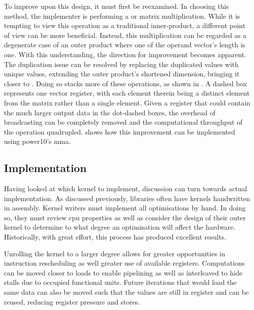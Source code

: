 \documentclass[\main/thesis.tex]{subfiles}
\begin{document}
To improve upon this design, it must first be reexamined.
In choosing this method, the implementer is performing a  or  matrix multiplication.
While it is tempting to view this operation as a traditional inner-product, a different point of view can be more beneficial.
Instead, this multiplication can be regarded as a degenerate case of an outer product where one of the operand vector's length is one.
With this understanding, the direction for improvement becomes apparent.
The duplication issue can be resolved by replacing the duplicated values with unique values, extending the outer product's shortened dimension, bringing it closer to .
Doing so stacks more of these operations, as shown in .
A dashed box represents one vector register, with each element therein being a distinct element from the matrix rather than a single  element.
Given a register that could contain the much larger output data in the dot-dashed boxes, the overhead of broadcasting can be completely removed and the computational throughput of the operation quadrupled.
 shows how this improvement can be implemented using \gls{power10}'s \gls{mma}.

\subsection{Implementation}
Having looked at which kernel to implement, discussion can turn towards actual implementation.
As discussed previously, libraries often have kernels handwritten in assembly.
Kernel writers must implement all optimisations by hand.
In doing so, they must review \gls{cpu} properties as well as consider the design of their outer kernel to determine to what degree an optimisation will affect the hardware.
Historically, with great effort, this process has produced excellent results.

Unrolling the kernel to a larger degree allows for greater opportunities in instruction rescheduling as well greater use of available registers.
Computations can be moved closer to loads to enable pipelining as well as interleaved to hide stalls due to occupied functional units.
Future iterations that would load the same data can also be moved such that the values are still in register and can be reused, reducing register pressure and stores.
\end{document}
